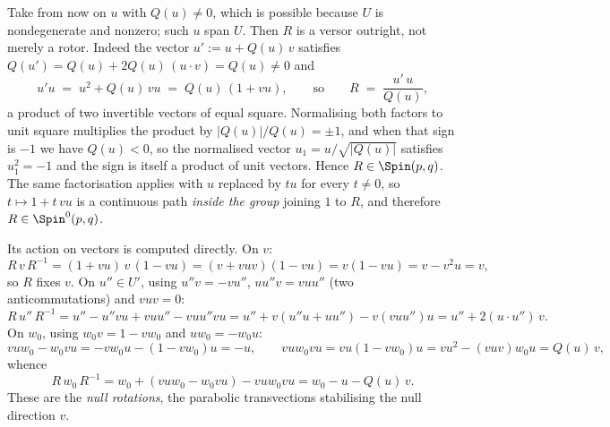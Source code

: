 Take from now on $u$ with $Q(u) \neq 0$, which is possible because $U$ is nondegenerate and nonzero; such $u$ span $U$. Then $R$ is a versor outright, not merely a rotor. Indeed the vector $u' \mathrel{:=} u + Q(u)\,v$ satisfies $Q(u') = Q(u) + 2Q(u)\,(u \cdot v) = Q(u) \neq 0$ and
\begin{equation}\label{eq:versorfactor}
u'u \;=\; u^2 + Q(u)\,vu \;=\; Q(u)\,(1 + vu), \qquad \text{so} \qquad R \;=\; \frac{u'\,u}{Q(u)},
\end{equation}
a product of two invertible vectors of equal square. Normalising both factors to unit square multiplies the product by $|Q(u)|/Q(u) = \pm 1$, and when that sign is $-1$ we have $Q(u) < 0$, so the normalised vector $u_{1} = u/\sqrt{|Q(u)|}$ satisfies $u_{1}^2 = -1$ and the sign is itself a product of unit vectors. Hence $R \in \Spin(p,q)$. The same factorisation applies with $u$ replaced by $tu$ for every $t \neq 0$, so $t \mapsto 1 + t\,vu$ is a continuous path \emph{inside the group} joining $1$ to $R$, and therefore $R \in \Spin^0(p,q)$.

Its action on vectors is computed directly. On $v$:
\[
R\,v\,R^{-1} = (1 + vu)\,v\,(1 - vu) = (v + vuv)(1 - vu) = v(1 - vu) = v - v^2u = v ,
\]
so $R$ fixes $v$. On $u'' \in U'$, using $u''v = -vu''$, $u u'' v = v u u''$ (two anticommutations) and $vuv = 0$:
\[
R\,u''\,R^{-1} = u'' - u''vu + vuu'' - vuu''vu = u'' + v(u''u + uu'') - v(vuu'')u = u'' + 2(u \cdot u'')\,v .
\]
On $w_0$, using $w_0 v = 1 - v w_0$ and $u w_0 = -w_0 u$:
\[
vuw_0 - w_0vu = -vw_0u - (1 - vw_0)u = -u, \qquad
vuw_0vu = vu(1 - vw_0)u = vu^2 - (vuv)w_0u = Q(u)\,v,
\]
whence
\[
R\,w_0\,R^{-1} = w_0 + (vuw_0 - w_0vu) - vuw_0vu = w_0 - u - Q(u)\,v .
\]
These are the \emph{null rotations}, the parabolic transvections stabilising the null direction $v$.

